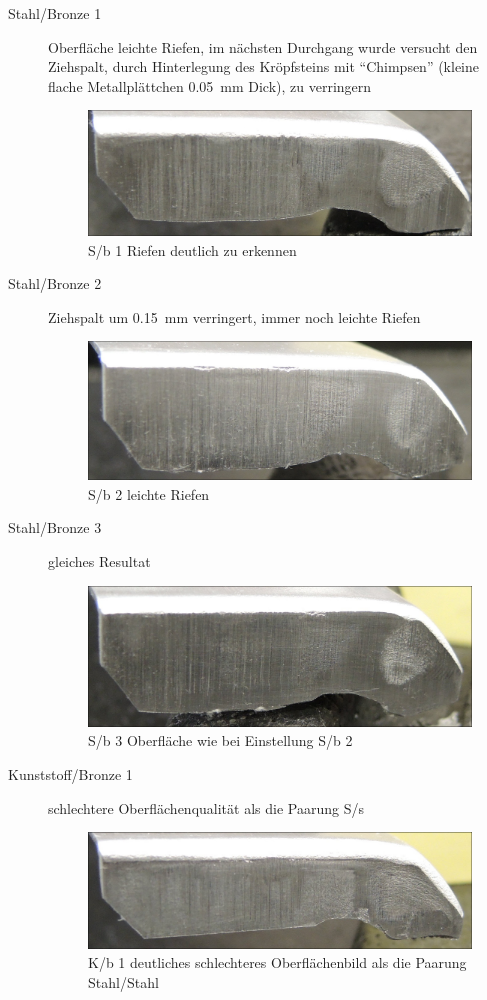 \documentclass[12pt,a4paper,parskip,twoside,BCOR5mm,headsepline]{scrartcl}
\begin{document}
\begin{description*}
\begin{description}
\newpage

\item[Stahl/Bronze 1] Oberfläche leichte Riefen, im nächsten Durchgang wurde versucht den Ziehspalt,  durch Hinterlegung des Kröpfsteins mit "`Chimpsen"' (kleine flache Metallplättchen  \SI{0.05}{\milli\meter} Dick), zu verringern
\begin{figure}[H]
\centering
\includegraphics[width=.8\textwidth]{Sb1a}
\caption{S/b 1 Riefen deutlich zu erkennen}
\label{fig:sb1}
\end{figure}
\item[Stahl/Bronze 2] Ziehspalt um \SI{0.15}{\milli\meter} verringert, immer noch leichte Riefen
\begin{figure}[H]
\centering
\includegraphics[width=.8\textwidth]{Sb2}
\caption{S/b 2 leichte Riefen }
\label{sb2}
\end{figure}
\item[Stahl/Bronze 3] gleiches Resultat
\begin{figure}[H]
\centering
\includegraphics[width=.8\textwidth]{Sb3}
\caption{S/b 3 Oberfläche wie bei Einstellung S/b 2}
\label{fig:sb3}
\end{figure}

\item[Kunststoff/Bronze 1] schlechtere Oberflächenqualität als die Paarung S/s
\begin{figure}[H]
\centering
\includegraphics[width=.8\textwidth]{Kb1a}
\caption{K/b 1 deutliches schlechteres Oberflächenbild als die Paarung Stahl/Stahl}
\label{fig:Kb1a}
\end{figure}


\end{description}
\end{description*}
\end{document}
